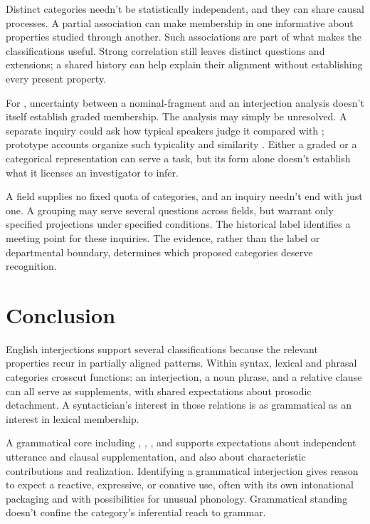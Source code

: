 \documentclass[12pt]{article}
\begin{document}
Distinct categories needn't be statistically independent, and they can
share causal processes. A partial association can make membership in
one informative about properties studied through another. Such associations
are part of what makes the classifications useful. Strong correlation
still leaves distinct questions and extensions; a shared history can
help explain their alignment without establishing every present property.

For , uncertainty between a nominal-fragment and an
interjection analysis doesn't itself establish graded membership. The
analysis may simply be unresolved. A separate inquiry could ask how
typical speakers judge it compared with ; prototype
accounts organize such typicality and similarity \citep{rosch1975,taylor2003}.
Either a graded or a categorical representation can serve a task,
but its form alone doesn't establish what it licenses an investigator
to infer.

A field supplies no fixed quota of categories, and an inquiry
needn't end with just one. A grouping may serve several questions across
fields, but warrant only specified projections under specified conditions.
The historical label  identifies a meeting point for
these inquiries. The evidence, rather than the label or departmental
boundary, determines which proposed categories deserve recognition.

\section{Conclusion}\label{sec:conclusion}

English interjections support several classifications because the relevant
properties recur in partially aligned patterns. Within syntax, lexical
and phrasal categories crosscut functions: an interjection, a noun phrase,
and a relative clause can all serve as supplements, with shared
expectations about prosodic detachment. A syntactician's interest in those
relations is as grammatical as an interest in lexical membership.

A grammatical core including
, , , and  supports
expectations about independent utterance and clausal supplementation, and
also about characteristic contributions and realization. Identifying a
grammatical interjection gives reason to expect a reactive, expressive,
or conative use, often with its own intonational packaging and with
possibilities for unusual phonology. Grammatical standing doesn't confine
the category's inferential reach to grammar.
\end{document}
